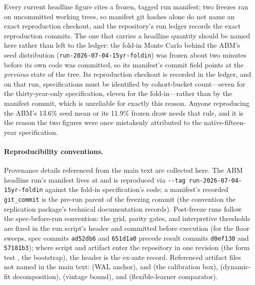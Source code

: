\documentclass[12pt]{article}
\begin{document}
Every current headline figure cites a frozen, tagged run manifest; two freezes ran on uncommitted working trees, so manifest git hashes alone do not name an exact reproduction checkout, and the repository's run ledger records the exact reproduction commits. The one that carries a headline quantity should be named here rather than left to the ledger: the fold-in Monte Carlo behind the ABM's seed distribution (\texttt{run-2026-07-04-15yr-foldin}) was frozen about two minutes before its own code was committed, so its manifest's commit field points at the \emph{previous} state of the tree. Its reproduction checkout is recorded in the ledger, and on that run, specifications must be identified by cohort-bucket count---seven for the thirty-year-only specification, eleven for the fold-in---rather than by the manifest commit, which is unreliable for exactly this reason. Anyone reproducing the ABM's 13.6\% seed mean or its 11.9\% frozen draw needs that rule, and it is the reason the two figures were once mistakenly attributed to the native-fifteen-year specification.

\paragraph{Reproducibility conventions.} Provenance details referenced from the main text are collected here. The ABM headline run's manifest lives at  and is reproduced via  \texttt{-{}-tag run-2026-07-04-15yr-foldin} against the fold-in specification's code; a manifest's recorded \texttt{git\_commit} is the pre-run parent of the freezing commit (the convention the replication package's technical documentation records). Post-freeze runs follow the spec-before-run convention: the grid, parity gates, and interpretive thresholds are fixed in the run script's header and committed before execution (for the floor sweeps, spec commits \texttt{ad52db6} and \texttt{651d1a0} precede result commits \texttt{d0ef130} and \texttt{57181b3}); where script and artifact enter the repository in one revision (the form test , the bootstrap), the header is the ex-ante record. Referenced artifact files not named in the main text:  (WAL anchor),  and  (the calibration box),  (dynamic-fit decomposition),  (vintage bound), and  (flexible-learner comparator).
\end{document}
